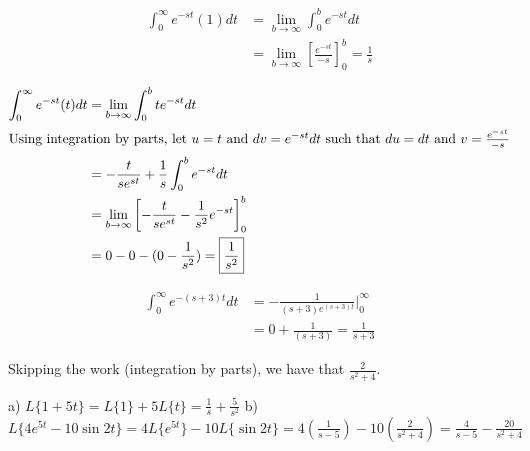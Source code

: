 \documentclass{article}
\begin{document}
\sol 
\begin{align*}
  \int_0^{\infty} e^{-st} (1) dt &= \lim_{b \to \infty} \int_0^b e^{-st} dt \\
  &= \lim_{b \to \infty} \left[ \frac{e^{-st}}{-s} \right]_0^b = \boxed{\frac{1}{s}}
\end{align*}

\sol
\begin{align*}
  \int_0^{\infty} e^{-st} (t) dt &= \lim_{b \to \infty} \int_0^b te^{-st} dt \\
  \intertext{Using integration by parts, let $u = t$ and $dv = e^{-st} dt$ such that $du = dt$ and $v = \frac{e^{-st}}{-s}$}
  &= -\frac{t}{se^{st}} + \frac{1}{s} \int_0^b e^{-st} dt \\
  &= \lim_{b \to \infty} \left[-\frac{t}{se^{st}} - \frac{1}{s^2} e^{-st} \right]_0^b \\
  &= 0 - 0 - (0 - \frac{1}{s^2}) = \boxed{\frac{1}{s^2}}
\end{align*}

\sol
\begin{align*}
  \int_0^{\infty} e^{-(s+3)t} dt &= -\frac{1}{(s+3)e^{(s+3)t}} \Big|_0^{\infty} \\
  &= 0 + \frac{1}{(s+3)} = \boxed{\frac{1}{s+3}}
\end{align*}


\sol Skipping the work (integration by parts), we have that $\boxed{\frac{2}{s^2 + 4}}$.



\sol
a) $L\{1+5t\} = L\{1\} + 5L\{t\} = \boxed{\frac{1}{s} + \frac{5}{s^2}}$
\double
b) $L\{4e^{5t} - 10 \sin 2t\} = 4L\{e^{5t}\} - 10L\{\sin 2t\} = 4 \left(\frac{1}{s-5}\right) - 10 \left(\frac{2}{s^2 + 4}\right) = \boxed{\frac{4}{s-5} - \frac{20}{s^2 + 4}}$
\end{document}
